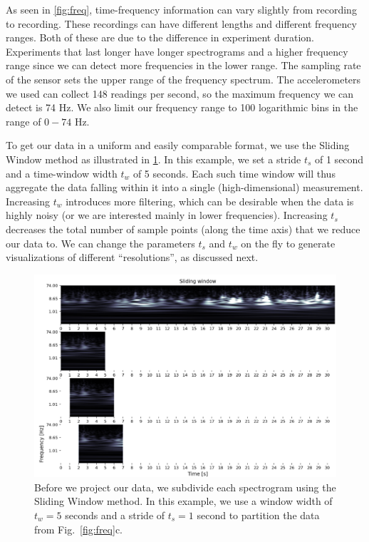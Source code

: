 As seen in \cref{fig:freq}, time-frequency information can vary slightly from recording to recording. These recordings can have different lengths and different frequency ranges. Both of these are due to the difference in experiment duration. Experiments that last longer have longer spectrograms and a higher frequency range since we can detect more frequencies in the lower range. The sampling rate of the sensor sets the upper range of the frequency spectrum. The accelerometers we used can collect 148 readings per second, so the maximum frequency we can detect is 74 Hz. We also limit our frequency range to 100 logarithmic bins in the range of $0-74$ Hz. 

To get our data in a uniform and easily comparable format, we use the Sliding Window method as illustrated in \cref{fig:sliding}. In this example, we set a stride $t_s$ of 1 second and a time-window width $t_w$ of 5 seconds. Each such time window will thus aggregate the data falling within it into a single (high-dimensional) measurement. Increasing $t_w$ introduces more filtering, which can be desirable when the data is highly noisy (or we are interested mainly in lower frequencies). Increasing $t_s$ decreases the total number of sample points (along the time axis) that we reduce our data to.
We can change the parameters $t_s$ and $t_w$ on the fly to generate visualizations of different ``resolutions'', as discussed next.

\begin{figure}[ht]
\centering
\includegraphics[width=\linewidth]{figures/nemo/sliding.png}
\caption{Before we project our data, we subdivide each spectrogram using the Sliding Window method. In this example, we use a window width of $t_w=5$ seconds and a stride of $t_s=1$ second to partition the data from Fig.~\ref{fig:freq}c.}
\label{fig:sliding}
\end{figure}

